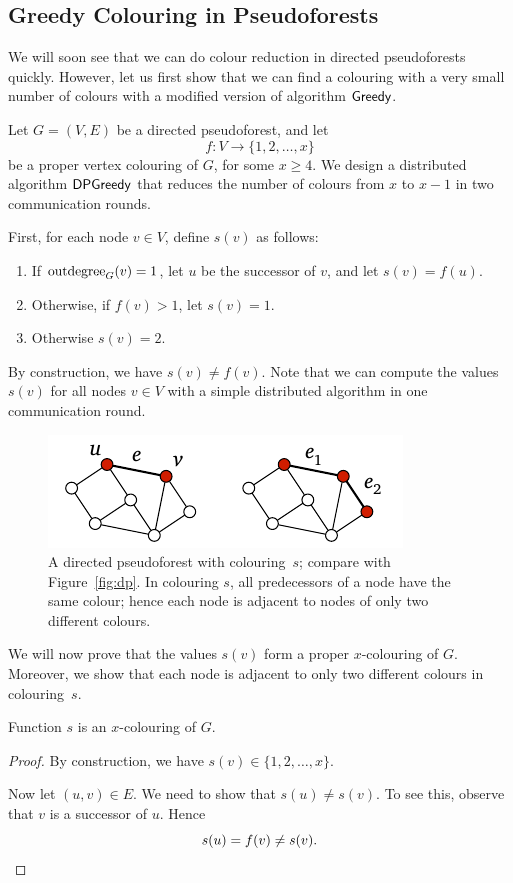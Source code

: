 \subsection{Greedy Colouring in Pseudoforests}\label{ssec:dpgreedy}

We will soon see that we can do colour reduction in directed pseudoforests quickly. However, let us first show that we can find a colouring with a very small number of colours with a modified version of algorithm $\textsf{Greedy}$.

Let $G = (V,E)$ be a directed pseudoforest, and let \[f\colon V \to \{1,2,\dotsc,x\}\] be a proper vertex colouring of $G$, for some $x \ge 4$. We design a distributed algorithm $\textsf{DPGreedy}$ that reduces the number of colours from $x$ to $x-1$ in two communication rounds.

First, for each node $v \in V$, define $s(v)$ as follows:
\begin{enumerate}
    \item If $\operatorname{outdegree}_G(v) = 1$, let $u$ be the successor of $v$, and let $s(v) = f(u)$.
    \item Otherwise, if $f(v) > 1$, let $s(v) = 1$.
    \item Otherwise $s(v) = 2$.
\end{enumerate}
By construction, we have $s(v) \ne f(v)$. Note that we can compute the values $s(v)$ for all nodes $v \in V$ with a simple distributed algorithm in one communication round.

\begin{figure}
    \centering
    \includegraphics[page=\PDPSuccessor]{figs.pdf}
    \caption{A directed pseudoforest with colouring~$s$; compare with Figure~\ref{fig:dp}. In colouring $s$, all predecessors of a node have the same colour; hence each node is adjacent to nodes of only two different colours.}\label{fig:dpsuccessor}
\end{figure}

We will now prove that the values $s(v)$ form a proper $x$-colouring of $G$. Moreover, we show that each node is adjacent to only two different colours in colouring~$s$.

\begin{lemma}
    Function $s$ is an $x$-colouring of $G$.
\end{lemma}
\begin{proof}
    By construction, we have $s(v) \in \{1,2,\dotsc,x\}$.
    
    Now let $(u,v) \in E$. We need to show that $s(u) \ne s(v)$. To see this, observe that $v$ is a successor of $u$. Hence
    \[
        s(u) = f(v) \ne s(v). \qedhere
    \]
\end{proof}

